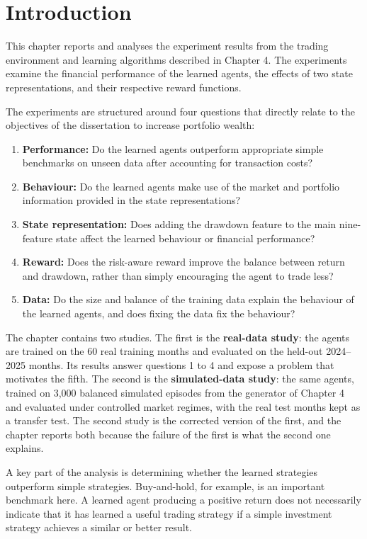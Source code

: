 \section{Introduction}

This chapter reports and analyses the experiment results from the
trading environment and learning algorithms described in Chapter 4. The
experiments examine the financial performance of the learned agents, the
effects of two state representations, and their respective reward
functions.

The experiments are structured around four questions that directly
relate to the objectives of the dissertation to increase portfolio
wealth:

\begin{enumerate}
\def\labelenumi{\arabic{enumi}.}
\item
  \textbf{Performance:} Do the learned agents outperform appropriate
  simple benchmarks on unseen data after accounting for transaction
  costs?
\item
  \textbf{Behaviour:} Do the learned agents make use of the market and
  portfolio information provided in the state representations?
\item
  \textbf{State representation:} Does adding the drawdown feature to the
  main nine-feature state affect the learned behaviour or financial
  performance?
\item
  \textbf{Reward:} Does the risk-aware reward improve the balance
  between return and drawdown, rather than simply encouraging the agent
  to trade less?
\item
  \textbf{Data:} Do the size and balance of the training data explain
  the behaviour of the learned agents, and does fixing the data fix the
  behaviour?
\end{enumerate}

The chapter contains two studies. The first is the \textbf{real-data
study}: the agents are trained on the 60 real training months and
evaluated on the held-out 2024--2025 months. Its results answer
questions 1 to 4 and expose a problem that motivates the fifth. The
second is the \textbf{simulated-data study}: the same agents, trained on
3,000 balanced simulated episodes from the generator of Chapter 4 and
evaluated under controlled market regimes, with the real test months
kept as a transfer test. The second study is the corrected version of
the first, and the chapter reports both because the failure of the
first is what the second one explains.

A key part of the analysis is determining whether the learned strategies
outperform simple strategies. Buy-and-hold, for example, is an important
benchmark here. A learned agent producing a positive return does not
necessarily indicate that it has learned a useful trading strategy if a
simple investment strategy achieves a similar or better result.

